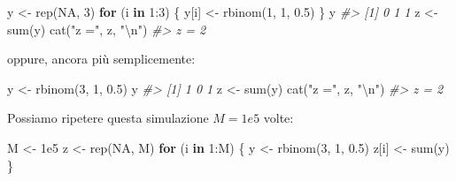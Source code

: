 \documentclass[
  11pt,
]{krantz}
\makeatletter
\newenvironment{Shaded}{\begin{snugshade}}{\end{snugshade}}
\newcommand{\CommentTok}[1]{\textcolor[rgb]{0.37,0.37,0.37}{\textit{#1}}}
\newcommand{\ConstantTok}[1]{\textcolor[rgb]{0,0,0}{#1}}
\newcommand{\ControlFlowTok}[1]{\textcolor[rgb]{0.27,0.27,0.27}{\textbf{#1}}}
\newcommand{\DecValTok}[1]{\textcolor[rgb]{0.06,0.06,0.06}{#1}}
\newcommand{\FloatTok}[1]{\textcolor[rgb]{0.06,0.06,0.06}{#1}}
\newcommand{\FunctionTok}[1]{\textcolor[rgb]{0,0,0}{#1}}
\newcommand{\NormalTok}[1]{#1}
\newcommand{\OtherTok}[1]{\textcolor[rgb]{0.37,0.37,0.37}{#1}}
\newcommand{\SpecialCharTok}[1]{\textcolor[rgb]{0,0,0}{#1}}
\newcommand{\StringTok}[1]{\textcolor[rgb]{0.5,0.5,0.5}{#1}}
\newenvironment{kframe}{%
\medskip{}
\setlength{\fboxsep}{.8em}
 \def\at@end@of@kframe{}%
 \ifinner\ifhmode%
  \def\at@end@of@kframe{\end{minipage}}%
  \begin{minipage}{\columnwidth}%
 \fi\fi%
 \def\FrameCommand##1{\hskip\@totalleftmargin \hskip-\fboxsep
 \colorbox{shadecolor}{##1}\hskip-\fboxsep
     \hskip-\linewidth \hskip-\@totalleftmargin \hskip\columnwidth}%
 \MakeFramed {\advance\hsize-\width
   \@totalleftmargin\z@ \linewidth\hsize
   \@setminipage}}%
 {\par\unskip\endMakeFramed%
 \at@end@of@kframe}
\renewenvironment{Shaded}{\begin{kframe}}{\end{kframe}}
\theoremstyle{definition}
\theoremstyle{definition}
\theoremstyle{definition}
\theoremstyle{definition}
\theoremstyle{remark}
\makeatother
\begin{document}
\begin{Shaded}
\begin{Highlighting}[]
\NormalTok{y }\OtherTok{\textless{}{-}} \FunctionTok{rep}\NormalTok{(}\ConstantTok{NA}\NormalTok{, }\DecValTok{3}\NormalTok{)}
\ControlFlowTok{for}\NormalTok{ (i }\ControlFlowTok{in} \DecValTok{1}\SpecialCharTok{:}\DecValTok{3}\NormalTok{) \{}
\NormalTok{  y[i] }\OtherTok{\textless{}{-}} \FunctionTok{rbinom}\NormalTok{(}\DecValTok{1}\NormalTok{, }\DecValTok{1}\NormalTok{, }\FloatTok{0.5}\NormalTok{)}
\NormalTok{\}}
\NormalTok{y}
\CommentTok{\#\textgreater{} [1] 0 1 1}
\NormalTok{z }\OtherTok{\textless{}{-}} \FunctionTok{sum}\NormalTok{(y)}
\FunctionTok{cat}\NormalTok{(}\StringTok{"z ="}\NormalTok{, z, }\StringTok{"}\SpecialCharTok{\textbackslash{}n}\StringTok{"}\NormalTok{)}
\CommentTok{\#\textgreater{} z = 2}
\end{Highlighting}
\end{Shaded}

oppure, ancora più semplicemente:

\begin{Shaded}
\begin{Highlighting}[]
\NormalTok{y }\OtherTok{\textless{}{-}} \FunctionTok{rbinom}\NormalTok{(}\DecValTok{3}\NormalTok{, }\DecValTok{1}\NormalTok{, }\FloatTok{0.5}\NormalTok{)}
\NormalTok{y}
\CommentTok{\#\textgreater{} [1] 1 0 1}
\NormalTok{z }\OtherTok{\textless{}{-}} \FunctionTok{sum}\NormalTok{(y)}
\FunctionTok{cat}\NormalTok{(}\StringTok{"z ="}\NormalTok{, z, }\StringTok{"}\SpecialCharTok{\textbackslash{}n}\StringTok{"}\NormalTok{)}
\CommentTok{\#\textgreater{} z = 2}
\end{Highlighting}
\end{Shaded}

Possiamo ripetere questa simulazione \(M = 1e5\) volte:

\begin{Shaded}
\begin{Highlighting}[]
\NormalTok{M }\OtherTok{\textless{}{-}} \FloatTok{1e5}
\NormalTok{z }\OtherTok{\textless{}{-}} \FunctionTok{rep}\NormalTok{(}\ConstantTok{NA}\NormalTok{, M)}
\ControlFlowTok{for}\NormalTok{ (i }\ControlFlowTok{in} \DecValTok{1}\SpecialCharTok{:}\NormalTok{M) \{}
\NormalTok{  y }\OtherTok{\textless{}{-}} \FunctionTok{rbinom}\NormalTok{(}\DecValTok{3}\NormalTok{, }\DecValTok{1}\NormalTok{, }\FloatTok{0.5}\NormalTok{)}
\NormalTok{  z[i] }\OtherTok{\textless{}{-}} \FunctionTok{sum}\NormalTok{(y)}
\NormalTok{\}}
\end{Highlighting}
\end{Shaded}
\end{document}
